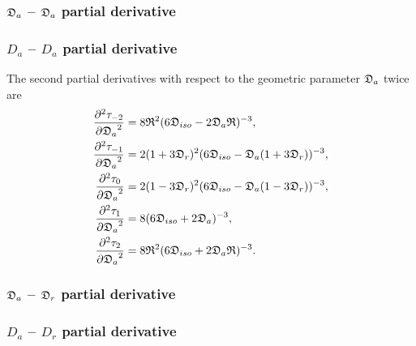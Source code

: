 \begin{latexonly}
    \subsubsection{$\mathfrak{D}_a$ -- $\mathfrak{D}_a$ partial derivative}
\end{latexonly}
\begin{htmlonly}
    \subsubsection{$D_a$ -- $D_a$ partial derivative}
\end{htmlonly}

The second partial derivatives with respect to the geometric parameter $\mathfrak{D}_a$ twice are
\begin{subequations}
\begin{align}
    \frac{\partial^2 \tau_{-2}}{{\partial \mathfrak{D}_a}^2} &= 8\mathfrak{R}^2 (6\mathfrak{D}_{iso} - 2\mathfrak{D}_a\mathfrak{R})^{-3}, \\
    \frac{\partial^2 \tau_{-1}}{{\partial \mathfrak{D}_a}^2} &= 2(1 + 3\mathfrak{D}_r)^2 (6\mathfrak{D}_{iso} - \mathfrak{D}_a (1 + 3\mathfrak{D}_r))^{-3}, \\
    \frac{\partial^2 \tau_{0}}{{\partial \mathfrak{D}_a}^2}  &= 2(1 - 3\mathfrak{D}_r)^2 (6\mathfrak{D}_{iso} - \mathfrak{D}_a (1 - 3\mathfrak{D}_r))^{-3}, \\
    \frac{\partial^2 \tau_{1}}{{\partial \mathfrak{D}_a}^2}  &= 8 (6\mathfrak{D}_{iso} + 2\mathfrak{D}_a)^{-3}, \\
    \frac{\partial^2 \tau_{2}}{{\partial \mathfrak{D}_a}^2}  &= 8\mathfrak{R}^2 (6\mathfrak{D}_{iso} + 2\mathfrak{D}_a\mathfrak{R})^{-3}.
\end{align}
\end{subequations}



\begin{latexonly}
    \subsubsection{$\mathfrak{D}_a$ -- $\mathfrak{D}_r$ partial derivative}
\end{latexonly}
\begin{htmlonly}
    \subsubsection{$D_a$ -- $D_r$ partial derivative}
\end{htmlonly}

